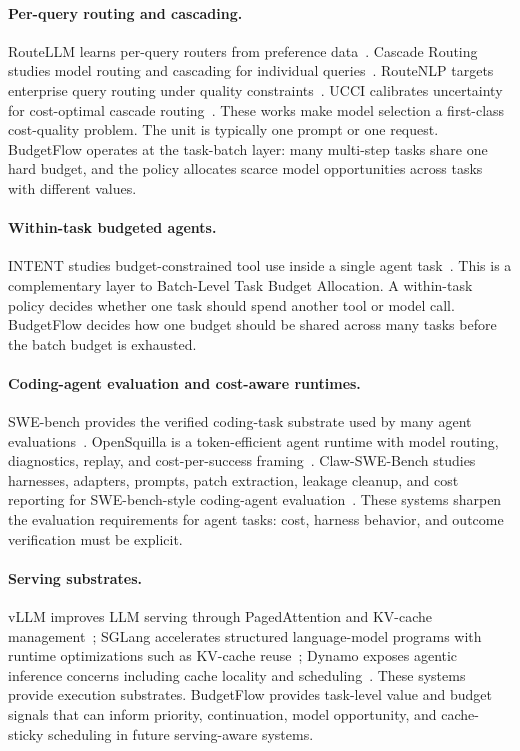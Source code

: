 \documentclass{article}
\begin{document}
\paragraph{Per-query routing and cascading.}
RouteLLM learns per-query routers from preference data~\cite{routellm}. Cascade Routing studies model routing and cascading for individual queries~\cite{cascade-routing}. RouteNLP targets enterprise query routing under quality constraints~\cite{routenlp}. UCCI calibrates uncertainty for cost-optimal cascade routing~\cite{ucci}. These works make model selection a first-class cost-quality problem. The unit is typically one prompt or one request. BudgetFlow operates at the task-batch layer: many multi-step tasks share one hard budget, and the policy allocates scarce model opportunities across tasks with different values.

\paragraph{Within-task budgeted agents.}
INTENT studies budget-constrained tool use inside a single agent task~\cite{intent}. This is a complementary layer to Batch-Level Task Budget Allocation. A within-task policy decides whether one task should spend another tool or model call. BudgetFlow decides how one budget should be shared across many tasks before the batch budget is exhausted.

\paragraph{Coding-agent evaluation and cost-aware runtimes.}
SWE-bench provides the verified coding-task substrate used by many agent evaluations~\cite{swebench}. OpenSquilla is a token-efficient agent runtime with model routing, diagnostics, replay, and cost-per-success framing~\cite{opensquilla}. Claw-SWE-Bench studies harnesses, adapters, prompts, patch extraction, leakage cleanup, and cost reporting for SWE-bench-style coding-agent evaluation~\cite{claw-swe-bench}. These systems sharpen the evaluation requirements for agent tasks: cost, harness behavior, and outcome verification must be explicit.

\paragraph{Serving substrates.}
vLLM improves LLM serving through PagedAttention and KV-cache management~\cite{vllm}; SGLang accelerates structured language-model programs with runtime optimizations such as KV-cache reuse~\cite{sglang}; Dynamo exposes agentic inference concerns including cache locality and scheduling~\cite{dynamo}. These systems provide execution substrates. BudgetFlow provides task-level value and budget signals that can inform priority, continuation, model opportunity, and cache-sticky scheduling in future serving-aware systems.
\end{document}
